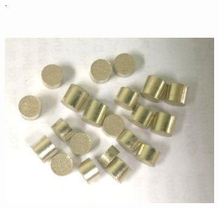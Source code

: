 \documentclass[a4paper,12pt,fleqn,twoside,openany]{book}
\begin{document}
\begin{figure}[h]
\begin{subfigure}{0.2\textwidth}
	\caption{}. 
	\label{fig:PastViruta}
    \end{subfigure}
    ~ %
    \begin{subfigure}{0.25\textwidth}
        \includegraphics[width=\textwidth]{Img/Procedimiento/PastMolienda.jpg}
        \caption{}
        \label{fig: PastMolienda}
    \end{subfigure}
    \begin{subfigure}{0.1\textwidth}

\end{subfigure}
\end{figure}
\end{document}
